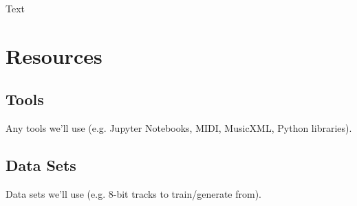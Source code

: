 \documentclass{article}
\begin{document}
Text

\section{Resources}

\subsection{Tools}
Any tools we'll use (e.g. Jupyter Notebooks, MIDI, MusicXML, Python libraries).

\subsection{Data Sets}
Data sets we'll use (e.g. 8-bit tracks to train/generate from).



\end{document}
